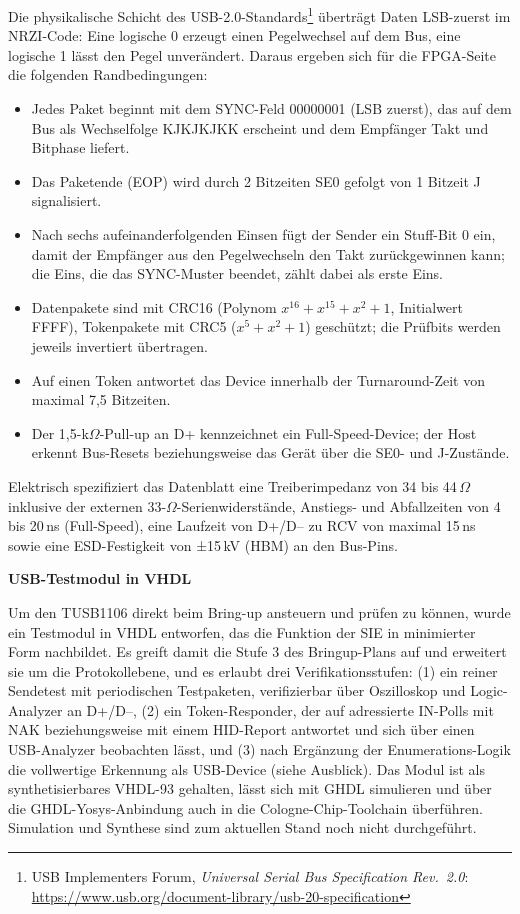 \documentclass[a4paper,11pt]{article}
\begin{document}
Die physikalische Schicht des USB-2.0-Standards\footnote{USB Implementers Forum, \textit{Universal Serial Bus Specification Rev.~2.0}: \url{https://www.usb.org/document-library/usb-20-specification}} überträgt Daten LSB-zuerst im NRZI-Code: Eine logische 0 erzeugt einen Pegelwechsel auf dem Bus, eine logische 1 lässt den Pegel unverändert. Daraus ergeben sich für die FPGA-Seite die folgenden Randbedingungen:
\begin{itemize}
	\item Jedes Paket beginnt mit dem SYNC-Feld 00000001 (LSB zuerst), das auf dem Bus als Wechselfolge KJKJKJKK erscheint und dem Empfänger Takt und Bitphase liefert.
	\item Das Paketende (EOP) wird durch 2 Bitzeiten SE0 gefolgt von 1 Bitzeit J signalisiert.
	\item Nach sechs aufeinanderfolgenden Einsen fügt der Sender ein Stuff-Bit 0 ein, damit der Empfänger aus den Pegelwechseln den Takt zurückgewinnen kann; die Eins, die das SYNC-Muster beendet, zählt dabei als erste Eins.
	\item Datenpakete sind mit CRC16 (Polynom $x^{16}+x^{15}+x^{2}+1$, Initialwert FFFF), Tokenpakete mit CRC5 ($x^{5}+x^{2}+1$) geschützt; die Prüfbits werden jeweils invertiert übertragen.
	\item Auf einen Token antwortet das Device innerhalb der Turnaround-Zeit von maximal 7,5 Bitzeiten.
	\item Der 1,5-k$\Omega$-Pull-up an D+ kennzeichnet ein Full-Speed-Device; der Host erkennt Bus-Resets beziehungsweise das Gerät über die SE0- und J-Zustände.
\end{itemize}
Elektrisch spezifiziert das Datenblatt eine Treiberimpedanz von 34 bis 44\,$\Omega$ inklusive der externen 33-$\Omega$-Serienwiderstände, Anstiegs- und Abfallzeiten von 4 bis 20\,ns (Full-Speed), eine Laufzeit von D+/D-- zu RCV von maximal 15\,ns sowie eine ESD-Festigkeit von ±15\,kV (HBM) an den Bus-Pins.

\textbf{USB-Testmodul in VHDL}

Um den TUSB1106 direkt beim Bring-up ansteuern und prüfen zu können, wurde ein Testmodul in VHDL entworfen, das die Funktion der SIE in minimierter Form nachbildet. Es greift damit die Stufe 3 des Bringup-Plans auf und erweitert sie um die Protokollebene, und es erlaubt drei Verifikationsstufen: (1) ein reiner Sendetest mit periodischen Testpaketen, verifizierbar über Oszilloskop und Logic-Analyzer an D+/D--, (2) ein Token-Responder, der auf adressierte IN-Polls mit NAK beziehungsweise mit einem HID-Report antwortet und sich über einen USB-Analyzer beobachten lässt, und (3) nach Ergänzung der Enumerations-Logik die vollwertige Erkennung als USB-Device (siehe Ausblick). Das Modul ist als synthetisierbares VHDL-93 gehalten, lässt sich mit GHDL simulieren und über die GHDL-Yosys-Anbindung auch in die Cologne-Chip-Toolchain überführen. Simulation und Synthese sind zum aktuellen Stand noch nicht durchgeführt.
\end{document}

